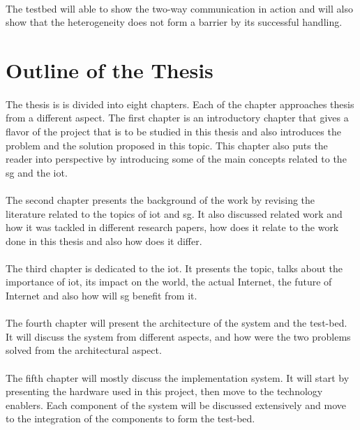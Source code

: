 \documentclass[oneside,12pt,a4paper,final]{book}
\begin{document}
\paragraph{}
The testbed will able to show the two-way communication in action and will also show that the heterogeneity does not form a barrier by its successful handling.

\section{Outline of the Thesis}
\paragraph{}
The thesis is is divided into eight chapters. Each of the chapter approaches thesis from a different aspect. The first chapter is an introductory chapter that gives a flavor of the project that is to be studied in this thesis and also introduces the problem and the solution proposed in this topic. This chapter also puts the reader into perspective by introducing some of the main concepts related to the \gls{sg} and the \gls{iot}. 
\paragraph{}
The second chapter presents the background of the work by revising the literature related to the topics of \gls{iot} and \gls{sg}. It also discussed related work and how it was tackled in different research papers, how does it relate to the work done in this thesis and also how does it differ.
\paragraph{}
The third chapter is dedicated to the \gls{iot}. It presents the topic, talks about the importance of \gls{iot}, its impact on the world, the actual Internet, the future of Internet and also how will \gls{sg} benefit from it.
\paragraph{}
The fourth chapter will present the architecture of the system and the test-bed. It will discuss the system from different aspects, and how were the two problems solved from the architectural aspect.
\paragraph{}
The fifth chapter will mostly discuss the implementation system. It will start by presenting the hardware used in this project, then move to the technology enablers. Each component of the system will be discussed extensively and move to the integration of the components to form the test-bed.
\end{document}
